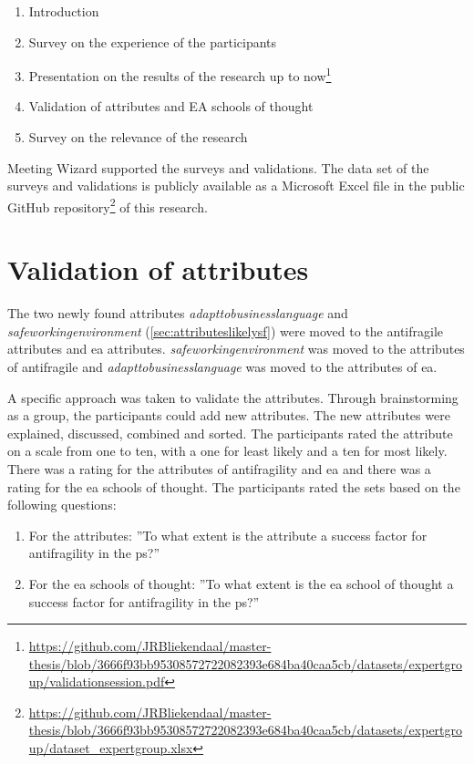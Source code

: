 \begin{enumerate}
	\item{Introduction}
	\item{Survey on the experience of the participants}
	\item{Presentation on the results of the research up to now\footnote{\url{https://github.com/JRBliekendaal/master-thesis/blob/3666f93bb95308572722082393e684ba40caa5cb/datasets/expertgroup/validationsession.pdf}}}
	\item{Validation of attributes and EA schools of thought}
	\item{Survey on the relevance of the research}
\end{enumerate}
Meeting Wizard supported the surveys and validations. The data set of the surveys and validations is publicly available as a Microsoft Excel file in the public GitHub repository\footnote{\url{https://github.com/JRBliekendaal/master-thesis/blob/3666f93bb95308572722082393e684ba40caa5cb/datasets/expertgroup/dataset_expertgroup.xlsx}} of this research.
\section{Validation of attributes}
\label{sec:validationofattributes}
The two newly found attributes \textit{\gls{adapttobusinesslanguage}} and \textit{\gls{safeworkingenvironment}} (\cref{sec:attributeslikelysf}) were moved to the \gls{antifragile} \glspl{attribute} and \acrshort{ea} \glspl{attribute}. \textit{\Gls{safeworkingenvironment}} was moved to the \glspl{attribute} of \gls{antifragile} and \textit{\gls{adapttobusinesslanguage}} was moved to the \glspl{attribute} of \acrshort{ea}. 

A specific approach was taken to validate the \glspl{attribute}. Through brainstorming as a group, the participants could add new \glspl{attribute}. The new \glspl{attribute} were explained, discussed, combined and sorted. The participants rated the \gls{attribute} on a scale from one to ten, with a one for least likely and a ten for most likely. There was a rating for the \glspl{attribute} of \gls{antifragility} and \acrshort{ea} and there was a rating for the \acrlong{ea} schools of thought. The participants rated the sets based on the following questions:
\begin{enumerate}
	\item{For the \glspl{attribute}: ''To what extent is the \gls{attribute} a success factor for \gls{antifragility} in the \gls{ps}?''}
	\item{For the \acrlong{ea} schools of thought: ''To what extent is the \acrlong{ea} school of thought a success factor for \gls{antifragility} in the \gls{ps}?''}
\end{enumerate}
